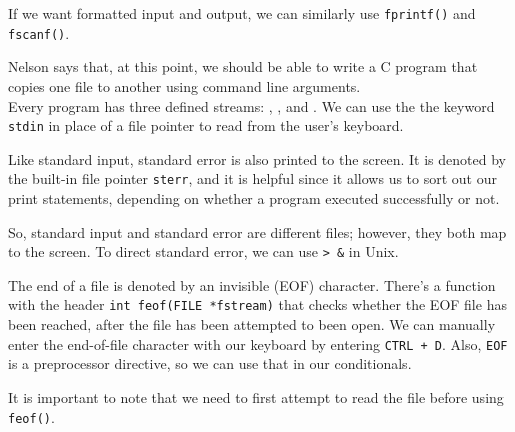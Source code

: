 If we want formatted input and output, we can similarly use \verb!fprintf()! and \verb!fscanf()!. 

Nelson says that, at this point, we should be able to write a C program that copies one file to another using command line arguments. \\

Every program has three defined streams: , , and . We can use the the keyword \verb!stdin! in place of a file pointer to read from the user's keyboard.

Like standard input, standard error is also printed to the screen. It is denoted by the built-in file pointer \verb!sterr!, and it is helpful since it allows us to sort out our print statements, depending on whether a program executed successfully or not. 

So, standard input and standard error are different files; however, they both map to the screen. To direct standard error, we can use \verb!> &! in Unix. 


The end of a file is denoted by an invisible  (EOF) character. There's a function with the header \verb!int feof(FILE *fstream)! that checks whether the EOF file has been reached, after the file has been attempted to been open. We can manually enter the end-of-file character with our keyboard by entering \texttt{CTRL + D}. Also, \verb!EOF! is a preprocessor directive, so we can use that in our conditionals.


It is important to note that we need to first attempt to read the file before using \verb!feof()!. 


